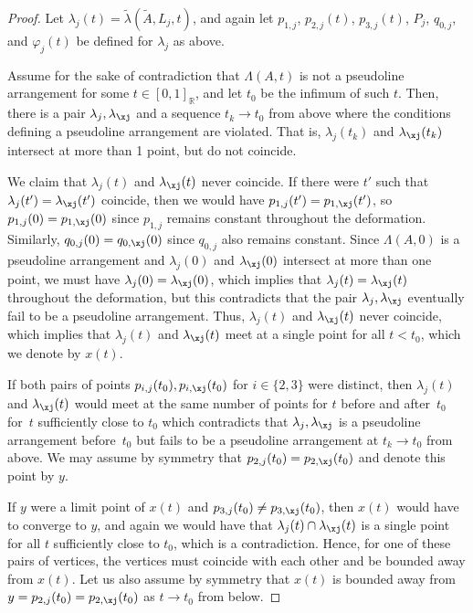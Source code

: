\documentclass[JEP,XML,SOM,Unicode,NoFloatCountersInSection,published]{cedram}
\theoremstyle{remark}
\let\mb\mathbb
\let\phi\varphi
\begin{document}
\begin{proof}
Let $\lambda_j(t)=\tilde \lambda(\tilde A, L_j,t)$, and again let $p_{1,j}$, $p_{2,j}(t)$, $p_{3,j}(t)$, $P_j$, $q_{0,j}$, and $\phi_j(t)$ be defined for $\lambda_j$ as above.

Assume for the sake of contradiction that $\Lambda(A,t)$ is not a pseudoline arrangement for some $t\in [0,1]_\mb{R}$, and let $t_0$ be the infimum of such $t$.
Then, there is a pair $\lambda_j,\lambda_\xj$ and a sequence $t_k \to t_0$ from above where the conditions defining a pseudoline arrangement are violated.
That is, $\lambda_j(t_k)$ and $\lambda_\xj(t_k)$ intersect at more than 1 point, but do not coincide.

We claim that $\lambda_j(t)$ and $\lambda_\xj(t)$ never coincide. If there were $t'$ such that $\lambda_j(t')=\lambda_\xj(t')$ coincide, then we would have $p_{1,j}(t') = p_{1,\xj}(t')$, so $p_{1,j}(0) = p_{1,\xj}(0)$ since $p_{1,j}$ remains constant throughout the deformation.
Similarly, $q_{0,j}(0) = q_{0,\xj}(0)$ since $q_{0,j}$ also remains constant.
Since $\Lambda(A,0)$ is a pseudoline arrangement and $\lambda_j(0)$ and $\lambda_\xj(0)$ intersect at more than one point, we must have $\lambda_j(0) = \lambda_\xj(0)$, which implies that $\lambda_j(t) = \lambda_\xj(t)$ throughout the deformation, but this contradicts that the pair $\lambda_j,\lambda_\xj$ eventually fail to be a pseudoline arrangement.
Thus, $\lambda_j(t)$ and $\lambda_\xj(t)$ never coincide,
which implies that $\lambda_j(t)$ and $\lambda_\xj(t)$ meet at a single point for all $t<t_0$, which we denote by $x(t)$.

If both pairs of points $p_{i,j}(t_0),p_{i,\xj}(t_0)$ for $i \in \{2,3\}$ were distinct, then $\lambda_j(t)$ and $\lambda_\xj(t)$ would meet at the same number of points for $t$ before and after~$t_0$ for~$t$ sufficiently close to $t_0$ which contradicts that $\lambda_j,\lambda_\xj$ is a pseudoline arrangement before~$t_0$ but fails to be a pseudoline arrangement at $t_k \to t_0$ from above.
We may assume by symmetry that $p_{2,j}(t_0) = p_{2,\xj}(t_0)$ and denote this point by $y$.

If $y$ were a limit point of $x(t)$
and $p_{3,j}(t_0) \neq p_{3,\xj}(t_0)$, then $x(t)$ would have to converge to $y$, and again we would have that $\lambda_j(t)\cap \lambda_\xj(t)$ is a single point for all $t$ sufficiently close to $t_0$, which is a contradiction. Hence, for one of these pairs of vertices, the vertices must coincide with each other and be bounded away from $x(t)$.
Let us also assume by symmetry that $x(t)$ is bounded away from $y = p_{2,j}(t_0) = p_{2,\xj}(t_0)$ as $t \to t_0$ from below.


\end{proof}
\end{document}
